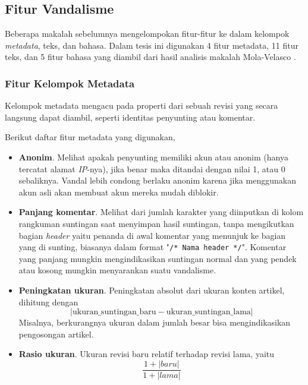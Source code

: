 \subsection{Fitur Vandalisme}

Beberapa makalah sebelumnya mengelompokan fitur-fitur ke dalam kelompok
\textit{metadata}, teks, dan bahasa.
Dalam tesis ini digunakan 4 fitur metadata, 11 fitur teks, dan 5 fitur
bahasa yang diambil dari hasil analisis makalah Mola-Velasco
\cite{mola2012wikipedia}.

\subsubsection{Fitur Kelompok Metadata}

Kelompok metadata mengacu pada properti dari sebuah revisi yang secara langsung
dapat diambil, seperti identitas penyunting atau komentar.

Berikut daftar fitur metadata yang digunakan,

\begin{itemize}

\item \textbf{Anonim}.
Melihat apakah penyunting memiliki akun atau anonim (hanya tercatat alamat
\textit{IP}-nya), jika benar maka ditandai dengan nilai 1, atau 0 sebaliknya.
Vandal lebih condong berlaku anonim karena jika menggunakan akun asli akan
membuat akun mereka mudah diblokir.

\item \textbf{Panjang komentar}.
Melihat dari jumlah karakter yang diinputkan di kolom rangkuman suntingan saat
menyimpan hasil suntingan, tanpa mengikutkan bagian \textit{header} yaitu
penanda di awal komentar yang menunjuk ke bagian yang di sunting, biasanya
dalam format "\texttt{/* Nama header */}".
Komentar yang panjang mungkin mengindikasikan suntingan normal dan yang pendek
atau kosong mungkin menyarankan suatu vandalisme.

\item \textbf{Peningkatan ukuran}.
Peningkatan absolut dari ukuran konten artikel, dihitung dengan
\[
|\text{ukuran\_suntingan\_baru} - \text{ukuran\_suntingan\_lama}|
\]
Misalnya, berkurangnya ukuran dalam jumlah besar bisa mengindikasikan
pengosongan artikel.

\item \textbf{Rasio ukuran}.
Ukuran revisi baru relatif terhadap revisi lama, yaitu
\[
\frac{1 + |baru|}{1 + |lama|}
\]

\end{itemize}


